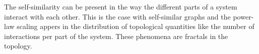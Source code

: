 The self-similarity can be present in the way the different parts of a system interact with each other. This is the case with self-similar graphs and the power-law scaling appers in the distribution of topological quantities like the number of interactions per part  of the system. These phenomena are fractals in the topology. 







